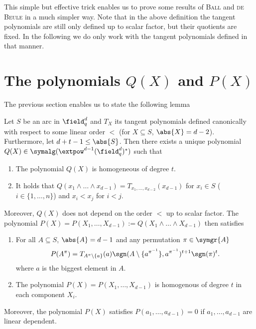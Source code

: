 \message{ !name(OnTheRAIDProblem.tex)}\documentclass[8pt,a4paper]{article}
\begin{document}
\begin{remark}
This simple but effective trick enables us to prove some results of \textsc{Ball} and \textsc{de Beule} in a much simpler way.
Note that in the above definition the tangent polynomials are still only defined up to scalar factor, but their quotients are fixed.
In the following we do only work with the tangent polynomials defined in that manner.
\end{remark}

\section{The polynomials $Q(X)$ and $P(X)$}

The previous section enables us to state the following lemma

\begin{lemma}
Let $S$ be an arc in $\field_q^d$ and $T_X$ its tangent polynomials
defined canonically with respect to some linear order $<$ (for
$X\subseteq S$, $\abs{X}=d-2$). Furthermore, let $d+t-1\leq
\abs{S}$. Then there exists a unique polynomial $Q(X)\in
\symalg(\extpow^{d-1}(\field_q^d)^*)$ such that
\begin{enumerate}
\item The polynomial $Q(X)$ is homogeneous of degree $t$.
\item It holds that $Q(x_1\wedge\ldots\wedge
  x_{d-1})=T_{x_1,\ldots,x_{d-2}}(x_{d-1})$ for $x_i\in S$
  ($i\in\{1,\ldots,n\}$) and $x_i<x_j$ for $i<j$.
\end{enumerate}

Moreover, $Q(X)$ does not depend on the order $<$ up to scalar factor.
The polynomial $P(X)=P(X_1,\ldots,X_{d-1}):=Q(X_1\wedge\ldots\wedge
X_{d-1})$ then satisfies

\begin{enumerate}
\item For all $A\subseteq S$, $\abs{A}=d-1$ and any permutation $\pi\in\symgr{A}$
\begin{align}
P(A^\pi)=T_{A^\pi\setminus\{a\}}(a)\sgn(A\setminus\{a^{\pi^{-1}}\},a^{\pi^{-1}})^{t+1}\sgn(\pi)^t\text{.}
\end{align}
where $a$ is the biggest element in $A$.
\item The polynomial $P(X)=P(X_1,\ldots,X_{d-1})$ is homogenous of
  degree $t$ in each component $X_i$.
\end{enumerate}
Moreover, the polynomial $P(X)$ satisfies $P(a_1,\ldots,a_{d-1})=0$ if
$a_1,\ldots,a_{d-1}$ are linear dependent.
\end{lemma}
\end{document}
